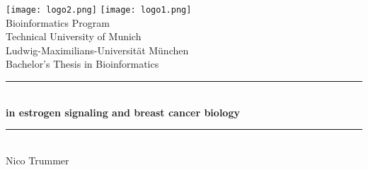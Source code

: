 \documentclass[pdftex,12pt,a4paper]{report}
\newcommand{\HRule}{\rule{\linewidth}{0.5mm}}
\begin{document}
\setcounter{tocdepth}{4}



\begin{titlepage}

    \sffamily

    \begin{center}

        \texttt{[image: logo2.png]}
        \hfill
        \texttt{[image: logo1.png]}
        \\[5cm]

        {\Large Bioinformatics Program}\\[0.5cm]
        {\Large Technical University of Munich}\\[0.5cm]
        {\Large Ludwig-Maximilians-Universit\"at M\"unchen}\\[2cm]
        {\Large Bachelor's Thesis in Bioinformatics}\\[1.5cm]

        \HRule \\[0.4cm]
        { \huge \bfseries {} in estrogen signaling and breast
        cancer
        biology}\\[0.4cm]

        \HRule \\[1.5cm]

        {\Large Nico Trummer}\\[2.5cm]

        \vfill
    \end{center}
\end{titlepage}
\pagestyle{empty}
\end{document}
